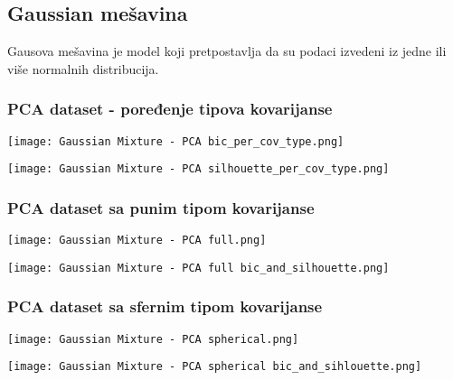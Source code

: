 \documentclass[a4paper]{article}
\begin{document}
    \subsection{Gaussian mešavina}
        Gausova mešavina je model koji pretpostavlja da su podaci izvedeni iz jedne ili više normalnih distribucija.

        \subsubsection{PCA dataset - poređenje tipova kovarijanse}

        \begin{center}
            \label{im:Gaussian Mixture - PCA bic_per_cov_type}
            \texttt{[image: Gaussian Mixture - PCA bic\_per\_cov\_type.png]}
        \end{center}

        \begin{center}
            \label{im:Gaussian Mixture - PCA silhouette_per_cov_type}
            \texttt{[image: Gaussian Mixture - PCA silhouette\_per\_cov\_type.png]}
        \end{center}

        \newpage
        \subsubsection{PCA dataset sa punim tipom kovarijanse}
        \begin{center}
            \label{im:Gaussian Mixture - full}
            \texttt{[image: Gaussian Mixture - PCA full.png]}
        \end{center}
        \begin{center}
            \label{im:Gaussian Mixture - full}
            \texttt{[image: Gaussian Mixture - PCA full bic\_and\_silhouette.png]}
        \end{center}

        \newpage
        \subsubsection{PCA dataset sa sfernim tipom kovarijanse}
        \begin{center}
            \label{im:Gaussian Mixture - spherical}
            \texttt{[image: Gaussian Mixture - PCA spherical.png]}
        \end{center}
        \begin{center}
            \label{im:Gaussian Mixture - spherical}
            \texttt{[image: Gaussian Mixture - PCA spherical bic\_and\_sihlouette.png]}
        \end{center}
\end{document}
